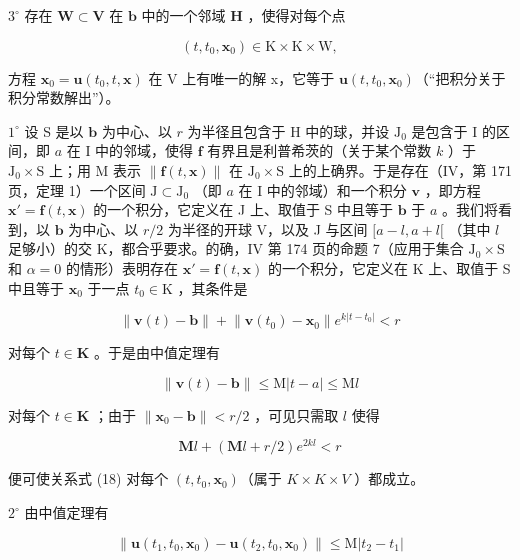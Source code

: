 \(3^{\circ}\) 存在 \(\mathbf{W} \subset \mathbf{V}\) 在 \(\mathbf{b}\) 中的一个邻域 \(\mathbf{H}\) ，使得对每个点

\[
(t, t _ {0}, \mathbf {x} _ {0}) \in \mathrm{K} \times \mathrm{K} \times \mathrm{W},
\]

方程 \(\mathbf{x}_{0} = \mathbf{u}(t_{0}, t, \mathbf{x})\) 在 V 上有唯一的解 x，它等于 \(\mathbf{u}(t, t_{0}, \mathbf{x}_{0})\)（“把积分关于积分常数解出”）。

\(1^{\circ}\) 设 S 是以 \(\mathbf{b}\) 为中心、以 \(r\) 为半径且包含于 H 中的球，并设 \(\mathrm{J}_0\) 是包含于 I 的区间，即 \(a\) 在 I 中的邻域，使得 \(\mathbf{f}\) 有界且是利普希茨的（关于某个常数 \(k\) ）于 \(\mathrm{J}_0 \times \mathrm{S}\) 上；用 M 表示 \(\| \mathbf{f}(t, \mathbf{x})\|\) 在 \(\mathrm{J}_0 \times \mathrm{S}\) 上的上确界。于是存在（IV，第 171 页，定理 1）一个区间 \(\mathrm{J} \subset \mathrm{J}_0\) （即 \(a\) 在 I 中的邻域）和一个积分 \(\mathbf{v}\) ，即方程 \(\mathbf{x}' = \mathbf{f}(t, \mathbf{x})\) 的一个积分，它定义在 J 上、取值于 S 中且等于 \(\mathbf{b}\) 于 \(a\) 。我们将看到，以 \(\mathbf{b}\) 为中心、以 \(r/2\) 为半径的开球 V，以及 J 与区间 \([a - l, a + l[\) （其中 \(l\) 足够小）的交 K，都合乎要求。的确，IV 第 174 页的命题 7（应用于集合 \(\mathrm{J}_0 \times \mathrm{S}\) 和 \(\alpha = 0\) 的情形）表明存在 \(\mathbf{x}' = \mathbf{f}(t, \mathbf{x})\) 的一个积分，它定义在 K 上、取值于 S 中且等于 \(\mathbf{x}_0\) 于一点 \(t_0 \in \mathrm{K}\) ，其条件是

\[
\left\| \mathbf {v} (t) - \mathbf {b} \right\| + \left\| \mathbf {v} (t _ {0}) - \mathbf {x} _ {0} \right\| e ^ {k | t - t _ {0} |} <   r\tag{18}
\]

对每个 \(t \in \mathbf{K}\) 。于是由中值定理有

\[
\| \mathbf {v} (t) - \mathbf {b} \| \leqslant \mathrm{M} | t - a | \leqslant \mathrm{M} l
\]

对每个 \(t \in \mathbf{K}\) ；由于 \(\| \mathbf{x}_0 - \mathbf{b} \| < r / 2\) ，可见只需取 \(l\) 使得

\[
\mathbf {M} l + (\mathbf {M} l + r / 2) e ^ {2 k l} <   r\tag{19}
\]

便可使关系式 (18) 对每个 \((t, t_{0}, \mathbf{x}_{0})\)（属于 \(K \times K \times V\) ）都成立。

\(2^{\circ}\) 由中值定理有

\[
\left\| \mathbf {u} (t _ {1}, t _ {0}, \mathbf {x} _ {0}) - \mathbf {u} (t _ {2}, t _ {0}, \mathbf {x} _ {0}) \right\| \leqslant \mathrm{M} \left| t _ {2} - t _ {1} \right|\tag{20}
\]

